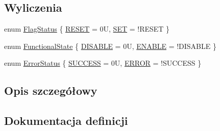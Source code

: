 \subsection*{Wyliczenia}
\begin{DoxyCompactItemize}
\item 
enum \hyperlink{group___exported__types_ga89136caac2e14c55151f527ac02daaff}{Flag\+Status} \{ \hyperlink{group___exported__types_gga89136caac2e14c55151f527ac02daaffa589b7d94a3d91d145720e2fed0eb3a05}{R\+E\+S\+ET} = 0U, 
\hyperlink{group___exported__types_gga89136caac2e14c55151f527ac02daaffab44c8101cc294c074709ec1b14211792}{S\+ET} = !\+R\+E\+S\+ET
 \}
\item 
enum \hyperlink{group___exported__types_gac9a7e9a35d2513ec15c3b537aaa4fba1}{Functional\+State} \{ \hyperlink{group___exported__types_ggac9a7e9a35d2513ec15c3b537aaa4fba1ad3a9df141be0ccf10389b640f492b26d}{D\+I\+S\+A\+B\+LE} = 0U, 
\hyperlink{group___exported__types_ggac9a7e9a35d2513ec15c3b537aaa4fba1a7d46875fa3ebd2c34d2756950eda83bf}{E\+N\+A\+B\+LE} = !\+D\+I\+S\+A\+B\+LE
 \}
\item 
enum \hyperlink{group___exported__types_ga8333b96c67f83cba354b3407fcbb6ee8}{Error\+Status} \{ \hyperlink{group___exported__types_gga8333b96c67f83cba354b3407fcbb6ee8ac7f69f7c9e5aea9b8f54cf02870e2bf8}{S\+U\+C\+C\+E\+SS} = 0U, 
\hyperlink{group___exported__types_gga8333b96c67f83cba354b3407fcbb6ee8a2fd6f336d08340583bd620a7f5694c90}{E\+R\+R\+OR} = !\+S\+U\+C\+C\+E\+SS
 \}
\end{DoxyCompactItemize}


\subsection{Opis szczegółowy}


\subsection{Dokumentacja definicji}
\mbox{\label{group___exported__types_gaffaf7c3f537d7a3370b1bbdda67a2bf6}} 
